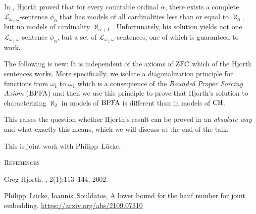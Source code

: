 \documentclass[bsl,meeting]{asl}
\newcommand{\NP}{}
\newcommand{\Loo}{\mathcal{L}_{\omega_1,\omega}}
\renewcommand{\aa}{\aleph_{\alpha}} %
\newcommand{\aapo}{\aleph_{\alpha+1}}%
\newcommand{\ZFC}{{\rm{ZFC}}}
\newcommand{\BPFA}{{\rm{BPFA}}}
\newcommand{\CH}{{\rm{CH}}}
\begin{document}
\thispagestyle{empty}


\NP
{}


 In \cite{HjorthsKnightsModel},  Hjorth proved  that for every countable ordinal  $\alpha$, there exists a complete $\Loo$-sentence $\phi_\alpha$ that has models of all cardinalities less than or equal to $\aa$, but no models of cardinality  $\aapo$.  
 Unfortunately, his solution yields not one  $\Loo$-sentence $\phi_\alpha$, but a  set of $\Loo$-sentences, one of which is guaranteed to work. 

The following is new: It is independent of the axioms of $\ZFC$ which of the Hjorth sentences works. More specifically, we isolate a diagonalization principle for functions from $\omega_1$ to $\omega_1$ which is a consequence of the \emph{Bounded Proper Forcing Axiom} ($\BPFA$) and then we use this principle to  prove that Hjorth's solution to characterizing $\aleph_2$ in models of $\BPFA$ is different than in models of $\CH$. 

This raises the question whether Hjorth's result can be proved in an \emph{absolute way} and what exactly this means, which we will discuss at the end of the talk. 


This is joint work with Philipp~L\"ucke. 
 
\textsc{References}
\begin{thebibliography}{10}
\newblock Greg {Hjorth}.
, 2(1):113--144, 2002.

\newblock Philipp~L\"ucke, Ioannis~Souldatos,
\newblock A lower bound for the hanf number for joint embedding.
\newblock \url{https://arxiv.org/abs/2109.07310}

\end{thebibliography}



\vspace*{-0.5\baselineskip}
\end{document}

